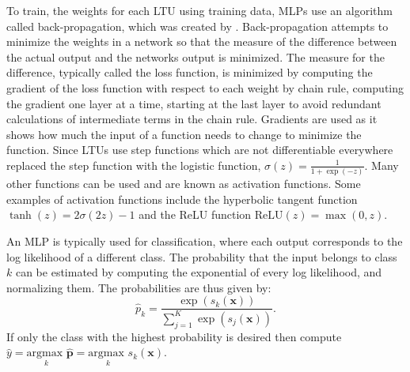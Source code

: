 \documentclass[\main/thesis.tex]{subfiles}
\begin{document}
To train, the weights for each LTU using training data, MLPs use an algorithm called back-propagation, which was created by \textcite{Rumelhart}. Back-propagation attempts to minimize the weights in a network so that the measure of the difference between the actual output and the networks output is minimized. The measure for the difference, typically called the loss function, is minimized by computing the gradient of the loss function with respect to each weight by chain rule, computing the gradient one layer at a time, starting at the last layer to avoid redundant calculations of intermediate terms in the chain rule. Gradients are used as it shows how much the input of a function needs to change to minimize the function. Since LTUs use step functions which are not differentiable everywhere \textcite{Rumelhart} replaced the step function with the logistic function, $\sigma(z) {=} \frac{1}{1 {+} \exp({-}z)}$. Many other functions can be used and are known as activation functions. Some examples of activation functions include the hyperbolic tangent function $\tanh(z) {=} 2\sigma(2z) {-} 1$ and the ReLU function $\text{ReLU}(z) {=} \max(0, z)$. 

An MLP is typically used for classification, where each output corresponds to the log likelihood of a different class. The probability that the input belongs to class $k$ can be estimated by computing the exponential of every log likelihood, and normalizing them. The probabilities are thus given by:
$$\hat{p}_k {=} \frac{\exp(s_k(\boldsymbol{x}))}{\sum_{j{=}1}^K \exp(s_j(\boldsymbol{x}))}.$$
If only the class with the highest probability is desired then compute 
$\hat{y} = \underset{k}{\text{argmax }} \boldsymbol{\hat{p}} = \underset{k}{\text{argmax }} s_k(\boldsymbol{x})$.
\end{document}
